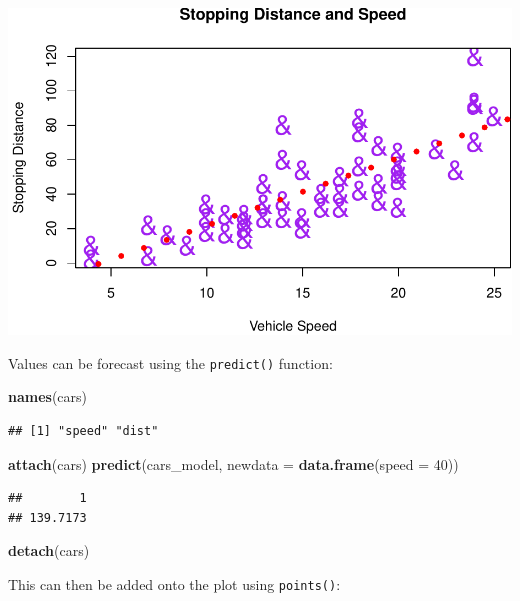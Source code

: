 \documentclass[]{article}
\newenvironment{Shaded}{}{}
\newcommand{\DataTypeTok}[1]{\textcolor[rgb]{0.56,0.13,0.00}{#1}}
\newcommand{\DecValTok}[1]{\textcolor[rgb]{0.25,0.63,0.44}{#1}}
\newcommand{\KeywordTok}[1]{\textcolor[rgb]{0.00,0.44,0.13}{\textbf{#1}}}
\newcommand{\NormalTok}[1]{#1}
\begin{document}
\includegraphics{./figure/unnamed-chunk-12-1.pdf}

Values can be forecast using the \texttt{predict()} function:

\begin{Shaded}
\begin{Highlighting}[]
\KeywordTok{names}\NormalTok{(cars)}
\end{Highlighting}
\end{Shaded}

\begin{verbatim}
## [1] "speed" "dist"
\end{verbatim}

\begin{Shaded}
\begin{Highlighting}[]
\KeywordTok{attach}\NormalTok{(cars)}
\KeywordTok{predict}\NormalTok{(cars_model, }\DataTypeTok{newdata =} \KeywordTok{data.frame}\NormalTok{(}\DataTypeTok{speed =} \DecValTok{40}\NormalTok{))}
\end{Highlighting}
\end{Shaded}

\begin{verbatim}
##        1 
## 139.7173
\end{verbatim}

\begin{Shaded}
\begin{Highlighting}[]
\KeywordTok{detach}\NormalTok{(cars)}
\end{Highlighting}
\end{Shaded}

This can then be added onto the plot using \texttt{points()}:
\end{document}
